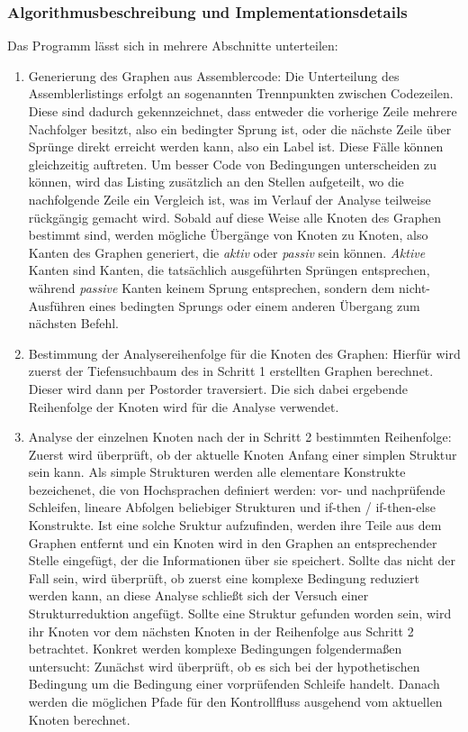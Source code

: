 \documentclass[11pt]{article} %
\begin{document}
\begin{multicols}{2}
\subsubsection{Algorithmusbeschreibung und Implementationsdetails}
Das Programm lässt sich in mehrere Abschnitte unterteilen:
\begin{enumerate}
\item{Generierung des Graphen aus Assemblercode:}
Die Unterteilung des Assemblerlistings erfolgt an sogenannten Trennpunkten zwischen Codezeilen. Diese sind dadurch gekennzeichnet, dass entweder die vorherige Zeile mehrere Nachfolger besitzt, also ein bedingter Sprung ist, oder die nächste Zeile über Sprünge direkt erreicht werden kann, also ein Label ist. Diese Fälle können gleichzeitig auftreten. Um besser Code von Bedingungen unterscheiden zu können, wird das Listing zusätzlich an den Stellen aufgeteilt, wo die nachfolgende Zeile ein Vergleich ist, was im Verlauf der Analyse teilweise rückgängig gemacht wird.
Sobald auf diese Weise alle Knoten des Graphen bestimmt sind, werden mögliche Übergänge von Knoten zu Knoten, also Kanten des Graphen generiert, die \textit{aktiv} oder \textit{passiv} sein können. \textit{Aktive} Kanten sind Kanten, die tatsächlich ausgeführten Sprüngen entsprechen, während \textit{passive} Kanten keinem Sprung entsprechen, sondern dem nicht-Ausführen eines bedingten Sprungs oder einem anderen Übergang zum nächsten Befehl.
\item{Bestimmung der Analysereihenfolge für die Knoten des Graphen:} Hierfür wird zuerst der Tiefensuchbaum des in Schritt 1 erstellten Graphen berechnet. Dieser wird dann per Postorder traversiert. Die sich dabei ergebende Reihenfolge der Knoten wird für die Analyse verwendet.
\item{Analyse der einzelnen Knoten nach der in Schritt 2 bestimmten Reihenfolge:} Zuerst wird überprüft, ob der aktuelle Knoten Anfang einer simplen Struktur sein kann. Als simple Strukturen werden alle elementare Konstrukte bezeichenet, die von Hochsprachen definiert werden: vor- und nachprüfende Schleifen, lineare Abfolgen beliebiger Strukturen und if-then / if-then-else Konstrukte. Ist eine solche Sruktur aufzufinden, werden ihre Teile aus dem Graphen entfernt und ein Knoten wird in den Graphen an entsprechender Stelle eingefügt, der die Informationen über sie speichert. Sollte das nicht der Fall sein, wird überprüft, ob zuerst eine komplexe Bedingung reduziert werden kann, an diese Analyse schließt sich der Versuch einer Strukturreduktion angefügt. Sollte eine Struktur gefunden worden sein, wird ihr Knoten vor dem nächsten Knoten in der Reihenfolge aus Schritt 2 betrachtet. Konkret werden komplexe Bedingungen folgendermaßen untersucht: Zunächst wird überprüft, ob es sich bei der hypothetischen Bedingung um die Bedingung einer vorprüfenden Schleife handelt. Danach werden die möglichen Pfade für den Kontrollfluss ausgehend vom aktuellen Knoten berechnet.

\end{enumerate}
\end{multicols}
\end{document}
